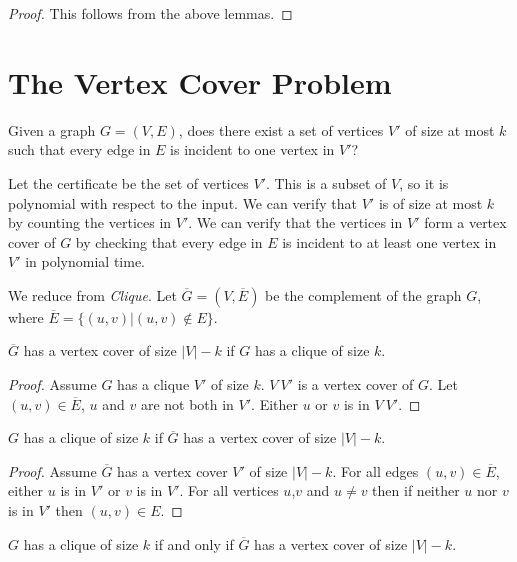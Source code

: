 \begin{proof}
  This follows from the above lemmas.
\end{proof}

\section{The Vertex Cover Problem}

Given a graph $G=(V,E)$, does there exist a set of vertices $V'$ of
size at most $k$ such that every edge in $E$ is incident to one vertex
in $V'$?

Let the certificate be the set of vertices $V'$.  This is a subset of
$V$, so it is polynomial with respect to the input.  We can verify
that $V'$ is of size at most $k$ by counting the vertices in $V'$.  We
can verify that the vertices in $V'$ form a vertex cover of $G$ by
checking that every edge in $E$ is incident to at least one vertex in
$V'$ in polynomial time.

We reduce from \emph{Clique}.  Let $\overline G = (V, \overline E)$ be
the complement of the graph $G$, where $\overline E = \{ (u,v) | (u,v)
\not \in E \}$.

\begin{lemma}
  $\overline G$ has a vertex cover of size $|V| - k$ if $G$ has a
  clique of size $k$.
\end{lemma}

\begin{proof}
  Assume $G$ has a clique $V'$ of size $k$.  $V \ V'$ is a vertex
  cover of $G$.  Let $(u,v) \in \overline E$, $u$ and $v$ are not both
  in $V'$.  Either $u$ or $v$ is in $V \ V'$.
\end{proof}

\begin{lemma}
  $G$ has a clique of size $k$ if $\overline G$ has a vertex cover of
  size $|V| - k$.
\end{lemma}

\begin{proof}
  Assume $\overline G$ has a vertex cover $V'$ of size $|V| - k$.  For
  all edges $(u,v) \in \overline E$, either $u$ is in $V'$ or $v$ is
  in $V'$.  For all vertices $u$,$v$ and $u \neq v$ then if neither
  $u$ nor $v$ is in $V'$ then $(u,v) \in E$.
\end{proof}

\begin{theorem}
  $G$ has a clique of size $k$ if and only if $\overline G$ has a
  vertex cover of size $|V| - k$.
\end{theorem}

